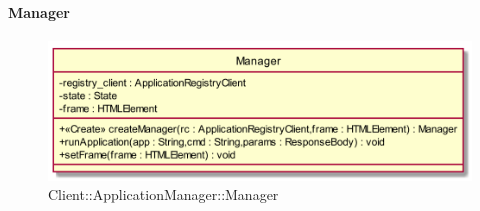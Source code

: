 \hypertarget{Manager_label}{\paragraph{Manager}}
\begin{figure}[h]
	\centering
	\includegraphics[width=\textwidth,height=\textheight,keepaspectratio]{images/ClassManager.png}
	\caption{Client::ApplicationManager::Manager}
\end{figure}
